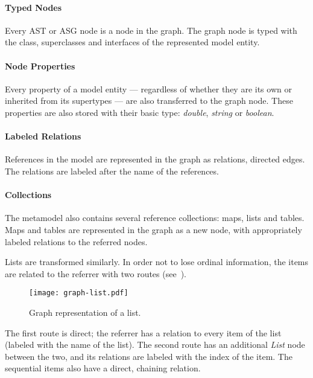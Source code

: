\paragraph{Typed Nodes}
Every AST or ASG node is a node in the graph. The graph node is typed with the class, superclasses and interfaces of the represented model entity.


\paragraph{Node Properties}
Every property of a model entity --- regardless of whether they are its own or inherited from its supertypes --- are also transferred to the graph node. These properties are also stored with their basic type: \emph{double}, \emph{string} or \emph{boolean}.

\paragraph{Labeled Relations}
References in the model are represented in the graph as relations, directed edges. The relations are labeled after the name of the references.

\paragraph{Collections}
The metamodel also contains several reference collections: maps, lists and tables. Maps and tables are represented in the graph as a new node, with appropriately labeled relations to the referred nodes.

Lists are transformed similarly. In order not to lose ordinal information, the items are related to the referrer with two routes (see~).

\begin{figure}[!htb]
  \centering
  \texttt{[image: graph-list.pdf]}
  \caption{Graph representation of a list.}
  \label{fig:graph-list}
\end{figure}

The first route is direct; the referrer has a relation to every item of the list (labeled with the name of the list). The second route has an additional \emph{List} node between the two, and its relations are labeled with the index of the item. The sequential items also have a direct, chaining relation.


